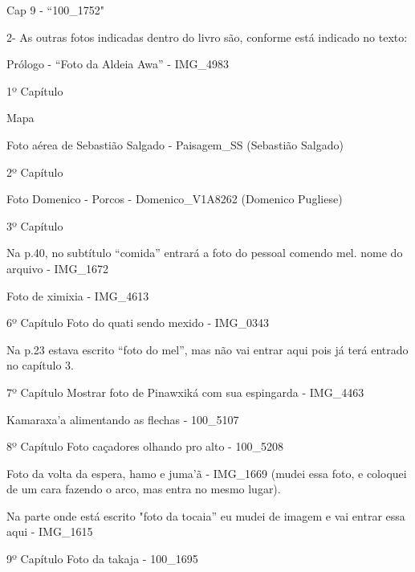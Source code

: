 Cap 9 - “100_1752"



2- As outras fotos indicadas dentro do livro são, conforme está indicado no texto:

Prólogo - “Foto da Aldeia Awa”  - IMG_4983


1º Capítulo

Mapa

Foto aérea de Sebastião Salgado - Paisagem_SS (Sebastião Salgado)


2º Capítulo

Foto Domenico - Porcos - Domenico_V1A8262 (Domenico Pugliese)


3º Capítulo

Na p.40, no subtítulo “comida” entrará a foto do pessoal comendo mel. nome do arquivo - IMG_1672

Foto de ximixia - IMG_4613


6º Capítulo
Foto do quati sendo mexido - IMG_0343

Na p.23 estava escrito “foto do mel”, mas não vai entrar aqui pois já terá entrado no capítulo 3.


7º Capítulo
Mostrar foto de Pinawxiká com sua espingarda - IMG_4463

Kamaraxa’a alimentando as flechas - 100_5107


8º Capítulo
Foto caçadores olhando pro alto - 100_5208

Foto da volta da espera, hamo e juma’ã - IMG_1669 (mudei essa foto, e coloquei de um cara fazendo o arco, mas entra no mesmo lugar).

Na parte onde está escrito "foto da tocaia” eu mudei de imagem e vai entrar essa aqui - IMG_1615


9º Capítulo
Foto da takaja - 100_1695

